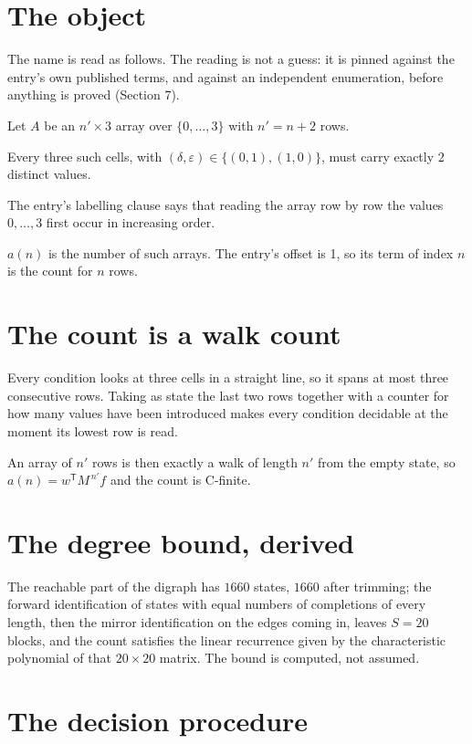 \documentclass[11pt]{article}
\theoremstyle{definition}
\begin{document}
\section{The object}

The name is read as follows. The reading is not a guess: it is pinned against the entry's own published terms, and against an independent enumeration, before anything is proved (Section 7).

Let $A$ be an $n' \times 3$ array over $\{0,\dots,3\}$ with $n' = n + 2$ rows.

Every three such cells, with $(\delta,\varepsilon) \in \{(0,1), (1,0)\}$, must carry exactly $2$ distinct values.

The entry's labelling clause says that reading the array row by row the values $0,\dots,3$ first occur in increasing order.

$a(n)$ is the number of such arrays. The entry's offset is 1, so its term of index $n$ is the count for $n$ rows.

\section{The count is a walk count}

Every condition looks at three cells in a straight line, so it spans at most three consecutive rows. Taking as state the last two rows together with a counter for how many values have been introduced makes every condition decidable at the moment its lowest row is read.

An array of $n'$ rows is then exactly a walk of length $n'$ from the empty state, so $a(n) = w^{\mathsf T}M^{\,n'}f$ and the count is C-finite.

\section{The degree bound, derived}

The reachable part of the digraph has $1660$ states, $1660$ after trimming; the forward identification of states with equal numbers of completions of every length, then the mirror identification on the edges coming in, leaves $S = 20$ blocks, and the count satisfies the linear recurrence given by the characteristic polynomial of that $20\times20$ matrix. The bound is computed, not assumed.

\section{The decision procedure}
\end{document}
